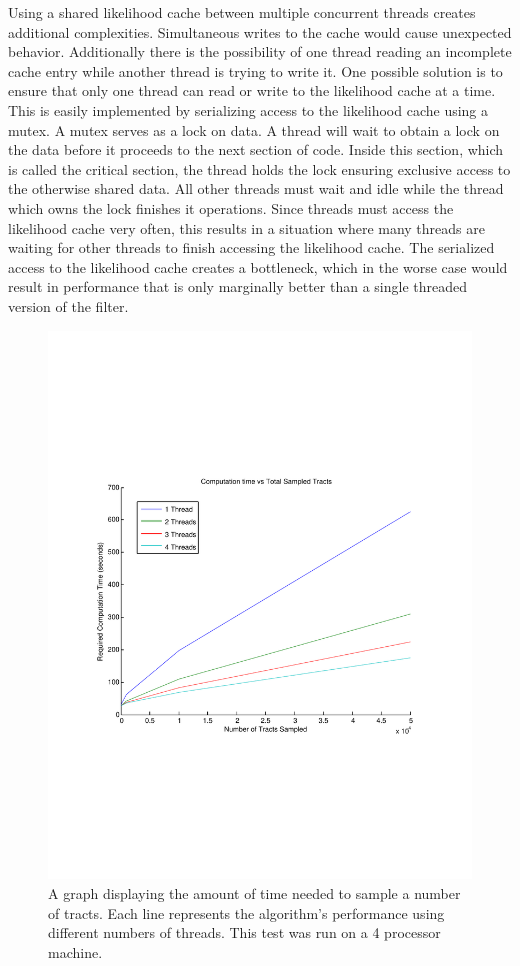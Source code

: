 \documentclass{InsightArticle}
\begin{document}
Using a shared likelihood cache between multiple concurrent threads creates additional complexities.  Simultaneous writes to the cache would cause unexpected behavior.  Additionally there is the possibility of one thread reading an incomplete cache entry while another thread is trying to write it.  One possible solution is to ensure that only one thread can read or write to the likelihood cache at a time.  This is easily implemented by serializing access to the likelihood cache using a mutex.  A mutex serves as a lock on data.  A thread will wait to obtain a lock on the data before it proceeds to the next section of code.  Inside this section, which is called the critical section, the thread holds the lock ensuring exclusive access to the otherwise shared data.  All other threads must wait and idle while the thread which owns the lock finishes it operations.  Since threads must access the likelihood cache very often, this results in a situation where many threads are waiting for other threads to finish accessing the likelihood cache.  The serialized access to the likelihood cache creates a bottleneck, which in the worse case would result in performance that is only marginally better than a single threaded version of the filter.
\begin{figure}
  \center
  \includegraphics[trim = 20mm 70mm 20mm 70mm, clip, width=0.75\linewidth]
	  {timepertracts}
	\caption{A graph displaying the amount of time needed to sample a number of tracts.  Each line represents the algorithm's performance using different numbers of threads.  This test was run on a 4 processor machine.}
	\label{fig:performance}
\end{figure}
\end{document}

